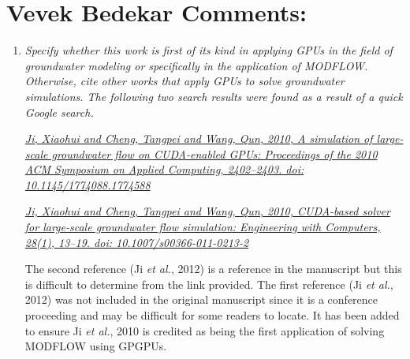 \documentclass[12pt]{article} %
\begin{document}
\section*{Vevek Bedekar Comments:}
\begin{enumerate}
\item \textit{Specify whether this work is first of its kind in applying GPUs in the field of groundwater modeling or specifically in the application of MODFLOW. Otherwise, cite other works that apply GPUs to solve groundwater simulations. The following two search results were found as a result of a quick Google search.} 

\textit{\href{http://doi.acm.org/10.1145/1774088.1774588}{Ji, Xiaohui and Cheng, Tangpei and Wang, Qun, 2010, A simulation of large-scale groundwater flow on CUDA-enabled GPUs: Proceedings of the 2010 ACM Symposium on Applied Computing, 2402--2403. doi: 10.1145/1774088.1774588}}

\textit{\href{http://www.gpucomputing.net/?q=node/14182}{Ji, Xiaohui and Cheng, Tangpei and Wang, Qun, 2010, CUDA-based solver for large-scale groundwater flow simulation: Engineering with Computers, 28(1), 13--19. doi: 10.1007/s00366-011-0213-2}}
 

The second reference (Ji \textit{et al.}, 2012) is a reference in the manuscript but this is difficult to determine from the link provided. The first reference (Ji \textit{et al.}, 2012) was not included in the original manuscript since it is a conference proceeding and may be difficult for some readers to locate. It has been added to ensure Ji \textit{et al.}, 2010 is credited as being the first application of solving MODFLOW using GPGPUs. 


\end{enumerate}
\end{document}

